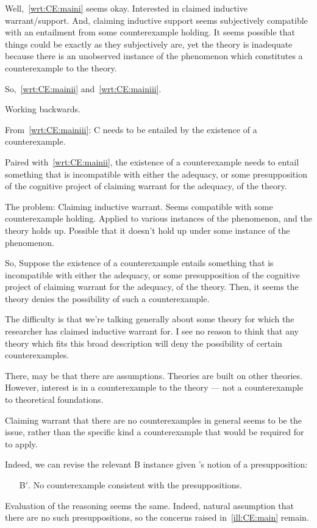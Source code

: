 \begin{note}
  Well,~\ref{wrt:CE:maini} seems okay.
  Interested in claimed inductive warrant/support.
  And, claiming inductive support seems subjectively compatible with an entailment from some counterexample holding.
  It seems possible that things could be exactly as they subjectively are, yet the theory is inadequate because there is an unobserved instance of the phenomenon which constitutes a counterexample to the theory.

  So,~\ref{wrt:CE:mainii} and~\ref{wrt:CE:mainiii}.

  Working backwards.

  From~\ref{wrt:CE:mainiii}:
  C needs to be entailed by the existence of a counterexample.

  Paired with~\ref{wrt:CE:mainii}, the existence of a counterexample needs to entail something that is incompatible with either the adequacy, or some presupposition of the cognitive project of claiming warrant for the adequacy, of the theory.


  The problem:
  Claiming inductive warrant.
  Seems compatible with some counterexample holding.
  Applied to various instances of the phenomenon, and the theory holds up.
  Possible that it doesn't hold up under some instance of the phenomenon.

  So,
  Suppose the existence of a counterexample entails something that is incompatible with either the adequacy, or some presupposition of the cognitive project of claiming warrant for the adequacy, of the theory.
  Then, it seems the theory denies the possibility of such a counterexample.

  The difficulty is that we're talking generally about some theory for which the researcher has claimed inductive warrant for.
  I see no reason to think that any theory which fits this broad description will deny the possibility of certain counterexamples.

  There, may be that there are assumptions.
  Theories are built on other theories.
  However, interest is in a counterexample to the theory --- not a counterexample to theoretical foundations.

  Claiming warrant that there are no counterexamples in general seems to be the issue, rather than the specific kind a counterexample that would be required for \wrt{} to apply.

  Indeed, we can revise the relevant B instance given \citeauthor{Wright:2011wn}'s notion of a presupposition:
  \begin{itemize}
  \item[B\('\).] No counterexample consistent with the presuppositions.
  \end{itemize}

  Evaluation of the reasoning seems the same.
  Indeed, natural assumption that there are no such presuppositions, so the concerns raised in~\autoref{ill:CE:main} remain.
\end{note}

